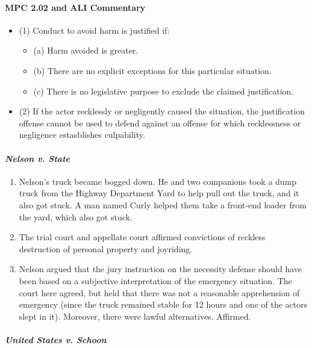 \paragraph{MPC 2.02 and ALI Commentary}

\begin{itemize}
    \item (1) Conduct to avoid harm is justified if:
    \begin{itemize}
        \item (a) Harm avoided is greater.
        \item (b) There are no explicit exceptions for this particular situation.
        \item (c) There is no legislative purpose to exclude the claimed justification.
    \end{itemize}
    \item (2) If the actor recklessly or negligently caused the situation, the justification offense cannot be used to defend against an offense for which recklessness or negligence estasblishes culpability.
\end{itemize}

\paragraph{\em{Nelson v. State}}

\begin{enumerate}
    \item Nelson's truck became bogged down. He and two companions took a dump truck from the Highway Department Yard to help pull out the truck, and it also got stuck. A man named Curly helped them take a front-end loader from the yard, which also got stuck.
    \item The trial court and appellate court affirmed convictions of reckless destruction of personal property and joyriding.
    \item Nelson argued that the jury instruction on the necessity defense should have been based on a subjective interpretation of the emergency situation. The court here agreed, but held that there was not a reasonable apprehension of emergency (since the truck remained stable for 12 hours and one of the actors slept in it). Moreover, there were lawful alternatives. Affirmed.
\end{enumerate}

\paragraph{\em{United States v. Schoon}}

